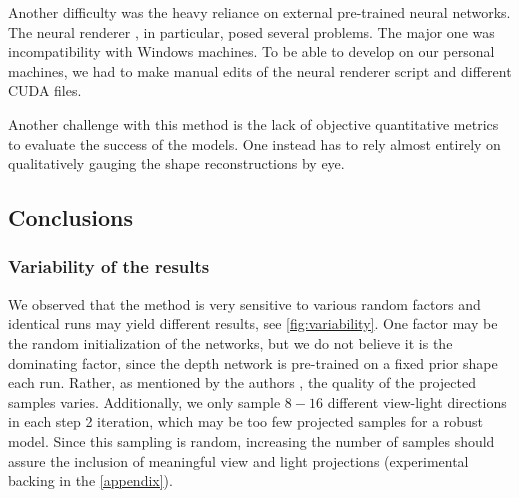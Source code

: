 Another difficulty was the heavy reliance on external pre-trained neural networks. 
The neural renderer \cite{neural-renderer}, in particular, posed several problems. The major one was incompatibility with Windows machines. To be able to develop on our personal machines, we had to make manual edits of the neural renderer script and different CUDA files.

Another challenge with this method is the lack of objective quantitative metrics to evaluate the success of the models. One instead has to rely almost entirely on qualitatively gauging the shape reconstructions by eye.

\subsection{Conclusions}

\subsubsection{Variability of the results}
\label{sec:variability}
We observed that the method is very sensitive to various random factors and identical runs may yield different results, see \autoref{fig:variability}. One factor may be the random initialization of the networks, but we do not believe it is the dominating factor, since the depth network is pre-trained on a fixed prior shape each run. Rather, as mentioned by the authors \cite{gan2shape}, the quality of the projected samples varies. 
Additionally, we only sample $8-16$ different view-light directions in each step 2 iteration, which may be too few projected samples for a robust model. Since this sampling is random, increasing the number of samples should assure the inclusion of meaningful view and light projections (experimental backing in the \autoref{appendix}).

